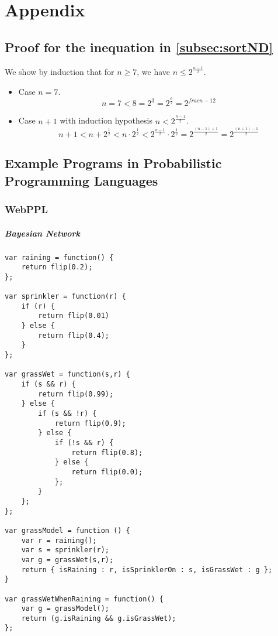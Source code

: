 \chapter{Appendix}
\label{sec:appendix}

\Blindtext[1][1]

\section{Proof for the inequation in \autoref{subsec:sortND}}
\label{sec:appendix:inequation}
We show by induction that for $n \geq 7$, we have $n \leq 2^{\frac{n-1}{2}}$.

\begin{itemize}
\item Case $n=7$.
  \[
    n = 7 < 8 = 2^3 = 2^{\frac{6}{2}}= 2^{frac{n-1}{2}}
  \]
\item Case $n + 1$ with induction hypothesis $n < 2^{\frac{n-1}{2}}$.
  \[
    n + 1 < n + 2^{\frac{1}{2}} < n \cdot 2^{\frac{1}{2}}< 2^{\frac{n-1}{2}} \cdot 2^{\frac{1}{2}} =  2^{\frac{(n-1) + 1}{2}} = 2^{\frac{(n+1)-1}{2}}
  \]
\end{itemize}

\section{Example Programs in Probabilistic Programming Languages}
\label{sec:appendix:ppl}

\subsection{WebPPL}

\paragraph{Bayesian Network}
\begin{verbatim}
var raining = function() {
    return flip(0.2);
};

var sprinkler = function(r) {
    if (r) {
        return flip(0.01)
    } else {
        return flip(0.4);
    }
};

var grassWet = function(s,r) {
    if (s && r) {
        return flip(0.99);
    } else {
        if (s && !r) {
            return flip(0.9);
        } else {
            if (!s && r) {
                return flip(0.8);
            } else {
                return flip(0.0);
            };
        }
    };
};

var grassModel = function () {
    var r = raining();
    var s = sprinkler(r);
    var g = grassWet(s,r);
    return { isRaining : r, isSprinklerOn : s, isGrassWet : g };
}

var grassWetWhenRaining = function() {
    var g = grassModel();
    return (g.isRaining && g.isGrassWet);
};

\end{verbatim}

